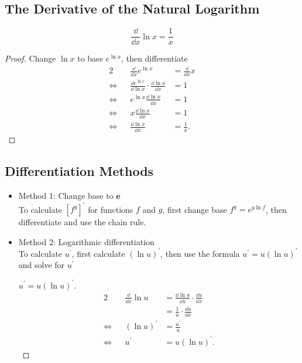 \subsection{The Derivative of the Natural Logarithm}
\[\frac\dd{\dd x}\ln x=\frac1 x\]
\begin{proof}
  Change $\ln x$ to base $e^{\ln x}$, then differentiate
  \begin{alignat*}{2}
             &&        \frac\dd{\dd x}e^{\ln x} & =\frac\dd{\dd x}x\\
    \iff{} && \frac{\dd e^{\ln x}}{\dd\ln x}\cdot\frac{\dd\ln x}{\dd x} & =1\\
    \iff{} && e^{\ln x}\frac{\dd\ln x}{\dd x} & =1\\
    \iff{} &&         x\frac{\dd\ln x}{\dd x} & =1\\
    \iff{} &&          \frac{\dd\ln x}{\dd x} & =\frac{1}{x}.
  \end{alignat*}
\end{proof}

\subsection{Differentiation Methods}
\begin{itemize}
\item Method 1: Change base to $\bm{e}$\\
To calculate $[f^g]^\prime$ for functions $f$ and $g$, first change base $f^g=e^{g\ln f}$, then differentiate and use the chain rule.
\item Method 2: Logarithmic differentiation\\
To calculate $u^\prime$, first calculate $(\ln u)^\prime$, then use the formula $u^\prime=u(\ln u)^\prime$ and solve for $u^\prime$
  \begin{proof}[$u^\prime=u(\ln u)^\prime$]
    \begin{alignat*}{2}
      && \frac{\dd }{\dd x}\ln u & =\frac{\dd \ln u}{\dd u}\cdot\frac{\dd u}{\dd x}\\
      &&                         & =\frac1 u\cdot\frac{\dd u}{\dd x}\\
      \iff && (\ln u)^\prime     & =\frac{u^\prime}{u}\\
      \iff && u^\prime           & =u(\ln u)^\prime .
    \end{alignat*}
  \end{proof}
\end{itemize}
